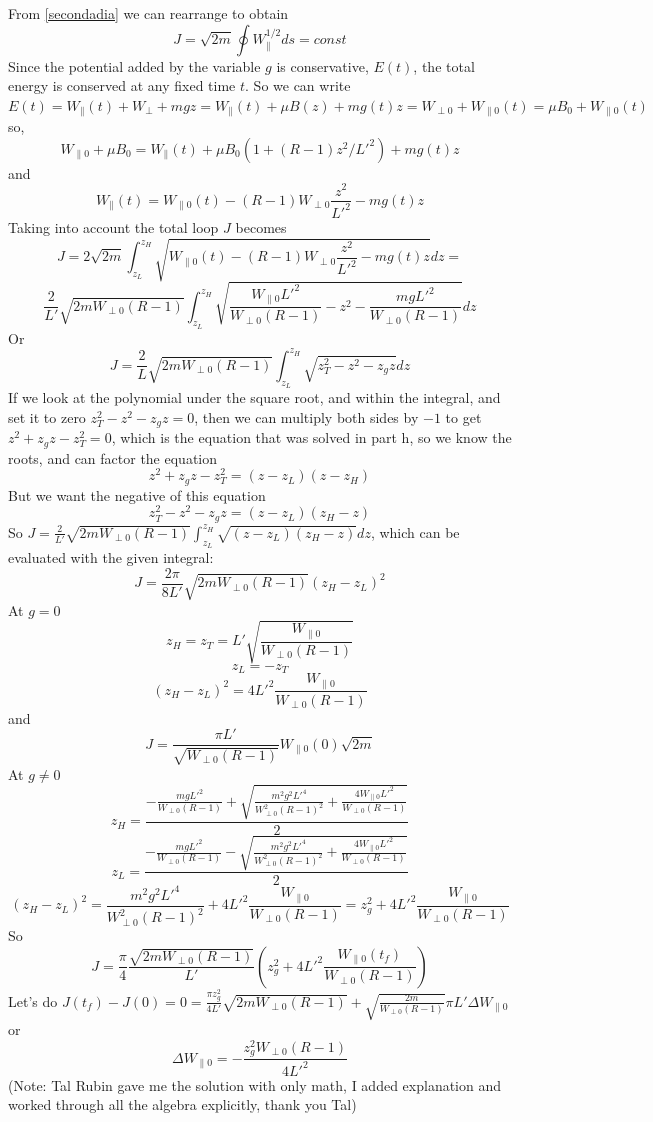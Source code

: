 \documentclass[12pt]{article}
\begin{document}
From \eqref{secondadia} we can rearrange to obtain
$$J=\sqrt{2m}\oint W_{\parallel}^{1/2}ds=const$$
Since the potential added by the variable $g$ is conservative, $E(t)$, the total energy is conserved at any fixed time $t$. So we can write $E(t)=W_{\parallel}(t)+W_{\perp}+mgz=W_{\parallel}(t)+\mu B(z)+mg(t)z=W_{\perp0}+W_{\parallel0}(t)=\mu B_0+W_{\parallel0}(t)$ so,
$$W_{\parallel0}+\mu B_0=W_{\parallel}(t)+\mu B_0(1+(R-1)z^2/L'^2)+mg(t)z$$
and
$$W_{\parallel}(t)=W_{\parallel0}(t)-(R-1)W_{\perp0}\frac{z^2}{L'^2}-mg(t)z$$
Taking into account the total loop $J$ becomes
$$J=2\sqrt{2m}\int_{z_L}^{z_H}\sqrt{W_{\parallel0}(t)-(R-1)W_{\perp0}\frac{z^2}{L'^2}-mg(t)z}dz=$$
$$\frac{2}{L'}\sqrt{2mW_{\perp0}(R-1)}\int_{z_L}^{z_H}\sqrt{\frac{W_{\parallel0}L'^2}{W_{\perp0}(R-1)}-z^2-\frac{mgL'^2}{W_{\perp0}(R-1)}}dz$$
Or
$$J=\frac{2}{L}\sqrt{2mW_{\perp0}(R-1)}\int_{z_L}^{z_H}\sqrt{z^2_T-z^2-z_gz}dz$$
If we look at the polynomial under the square root, and within the integral, and set it to zero $z_T^2-z^2-z_gz=0$, then we can multiply both sides by $-1$ to get $z^2+z_gz-z_T^2=0$, which is the equation that was solved in part h, so we know the roots, and can factor the equation
$$z^2+z_gz-z_T^2=(z-z_L)(z-z_H)$$
But we want the negative of this equation
$$z_T^2-z^2-z_gz=(z-z_L)(z_H-z)$$
So $J=\frac{2}{L'}\sqrt{2mW_{\perp0}(R-1)}\int_{z_L}^{z_H}\sqrt{(z-z_L)(z_H-z)}dz$, which can be evaluated with the given integral:
$$J=\frac{2\pi}{8L'}\sqrt{2mW_{\perp0}(R-1)}(z_H-z_L)^2$$  
At $g=0$ 
$$z_H=z_T=L'\sqrt{\frac{W_{\parallel0}}{W_{\perp0}(R-1)}}$$
$$z_L=-z_T$$
$$(z_H-z_L)^2=4L'^2\frac{W_{\parallel0}}{W_{\perp0}(R-1)}$$
and
$$J=\frac{\pi L'}{\sqrt{W_{\perp0}(R-1)}}W_{\parallel0}(0)\sqrt{2m}$$
At $g\neq 0$
$$z_H=\frac{-\frac{mgL'^2}{W_{\perp0}(R-1)}+\sqrt{\frac{m^2g^2L'^4}{W_{\perp0}^2(R-1)^2}+\frac{4W_{\parallel0}L'^2}{W_{\perp0}(R-1)}}}{2}$$
$$z_L=\frac{-\frac{mgL'^2}{W_{\perp0}(R-1)}-\sqrt{\frac{m^2g^2L'^4}{W_{\perp0}^2(R-1)^2}+\frac{4W_{\parallel0}L'^2}{W_{\perp0}(R-1)}}}{2}$$
$$(z_H-z_L)^2=\frac{m^2g^2L'^4}{W_{\perp0}^2(R-1)^2}+4L'^2\frac{W_{\parallel0}}{W_{\perp0}(R-1)}=z_g^2+4L'^2\frac{W_{\parallel0}}{W_{\perp0}(R-1)}$$
So
$$J=\frac{\pi}{4}\frac{\sqrt{2mW_{\perp0}(R-1)}}{L'}(z_g^2+4L'^2\frac{W_{\parallel0}(t_f)}{W_{\perp0}(R-1)})$$
Let's do $J(t_f)-J(0)=0=\frac{\pi z_g^2}{4L'}\sqrt{2mW_{\perp0}(R-1)}+\sqrt{\frac{2m}{W_{\perp0}(R-1)}}\pi L'\Delta W_{\parallel0}$ or
$$\boxed{\Delta W_{\parallel0}=-\frac{z_g^2W_{\perp0}(R-1)}{4L'^2}}$$
(Note: Tal Rubin gave me the solution with only math, I added explanation and worked through all the algebra explicitly, thank you Tal)
\vspace{3mm}
\end{document}
